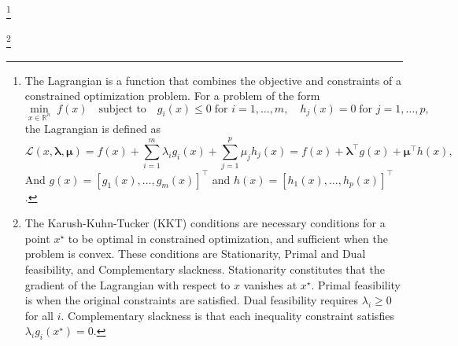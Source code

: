 \footnote{The Lagrangian is a function that combines the objective and constraints of a 
constrained optimization problem. For a problem of the form
\[
\min_{x \in \mathbb{R}^n} \; f(x) \quad \text{subject to} \quad g_i(x) \le 0 \; \text{for } i = 1, 
\ldots, m, \quad h_j(x) = 0 \; \text{for } j = 1, \ldots, p,
\]
the Lagrangian is defined as
\[
\mathcal{L}(x, \boldsymbol{\lambda}, \boldsymbol{\mu}) 
= f(x) + \sum_{i=1}^m \lambda_i g_i(x) + \sum_{j=1}^p \mu_j h_j(x) 
= f(x) + \boldsymbol{\lambda}^\top g(x) + \boldsymbol{\mu}^\top h(x),
\]
And $g(x) = [g_1(x), \ldots, g_m(x)]^\top$ and $h(x) = [h_1(x), \ldots, h_p(x)]^\top$.
}

\footnote{The Karush-Kuhn-Tucker (KKT) conditions are necessary conditions 
for a point $x^\star$ to be optimal in constrained optimization, and sufficient when the problem 
is convex. These conditions are Stationarity, Primal and Dual feasibility, and Complementary slackness. 
Stationarity constitutes that the gradient of the Lagrangian with respect to $x$ vanishes at $x^\star$. 
Primal feasibility is when the original constraints are satisfied. Dual feasibility requires 
$\lambda_i \ge 0$ for all $i$. Complementary slackness is that each inequality constraint satisfies 
$\lambda_i g_i(x^\star) = 0$.
}